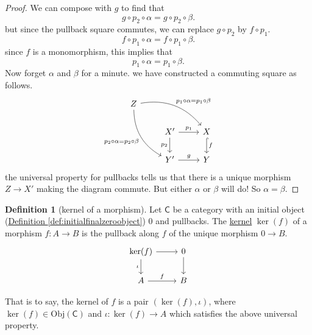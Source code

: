 \documentclass[a4paper,10pt]{scrreprt}
\newcommand{\defn}[1]{\ul{#1}}
\newcommand{\Obj}{\mathrm{Obj}}
\theoremstyle{definition}
\newtheorem{definition}{Definition}[section]
\theoremstyle{plain}
\theoremstyle{remark}
\begin{document}
\begin{proof}
  We can compose with $g$ to find that 
  \begin{equation*}
    g \circ p_{2} \circ \alpha = g \circ p_{2} \circ \beta.
  \end{equation*}
  but since the pullback square commutes, we can replace $g \circ p_{2}$ by $f \circ p_{1}$.
  \begin{equation*}
    f \circ p_{1} \circ \alpha = f \circ p_{1} \circ \beta.
  \end{equation*}
  since $f$ is a monomorphism, this implies that 
  \begin{equation*}
    p_{1} \circ \alpha = p_{1} \circ \beta.
  \end{equation*}
  Now forget $\alpha$ and $\beta$ for a minute. we have constructed a commuting square as follows.
  \begin{equation*}
    \begin{tikzcd}
      Z
      \arrow[drr, bend left, "p_{1} \circ \alpha = p_{1} \circ \beta"]
      \arrow[ddr, swap, bend right, "p_{2} \circ \alpha = p_{2} \circ \beta"]
      \\
      & X'
      \arrow[r, "p_{1}"]
      \arrow[d, swap, "p_{2}"]
      & X
      \arrow[d, hookrightarrow, "f"]
      \\
      & Y'
      \arrow[r, "g"]
      & Y
    \end{tikzcd}
  \end{equation*}
  the universal property for pullbacks tells us that there is a unique morphism $Z \to X'$ making the diagram commute. But either $\alpha$ or $\beta$ will do! So $\alpha = \beta$.
\end{proof}

\begin{definition}[kernel of a morphism]
  \label{def:kernelofmorphism}
  Let $\mathsf{C}$ be a category with an initial object (\hyperref[def:initialfinalzeroobject]{Definition \ref*{def:initialfinalzeroobject}}) $0$ and pullbacks. The \defn{kernel} $\ker(f)$ of a morphism $f\colon A \to B$ is the pullback along $f$ of the unique morphism $0 \to B$.
  \begin{equation*}
    \begin{tikzcd}
      \ker(f) \arrow[d, swap, "\iota"] \arrow[r] & 0 \arrow[d] \\
      A \arrow[r, "f"] & B
    \end{tikzcd}
  \end{equation*}

  That is to say, the kernel of $f$ is a pair $(\ker(f), \iota)$, where $\ker(f) \in \Obj(\mathsf{C})$ and $\iota\colon \ker(f) \to A$ which satisfies the above universal property.
\end{definition}
\end{document}
